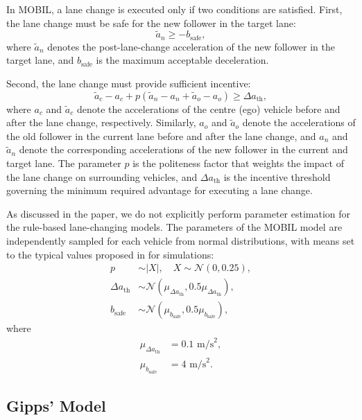 \documentclass[journal]{IEEEtran}
\begin{document}
In MOBIL, a lane change is executed only if two conditions are satisfied. First, the lane change must be safe for the new follower in the target lane:
\begin{equation}\label{eq:MOBIL1}
    \tilde{a}_n \ge -b_{\text{safe}},
\end{equation}
where $\tilde{a}_n$ denotes the post-lane-change acceleration of the new follower in the target lane, and $b_{\text{safe}}$ is the maximum acceptable deceleration.

Second, the lane change must provide sufficient incentive:
\begin{equation}\label{eq:MOBIL2}
    \tilde{a}_c - a_c + p\left( \tilde{a}_n - a_n + \tilde{a}_o - a_o \right) \ge \Delta a_{\text{th}},
\end{equation}
where $a_c$ and $\tilde{a}_c$ denote the accelerations of the centre (ego) vehicle before and after the lane change, respectively. Similarly, $a_o$ and $\tilde{a}_o$ denote the accelerations of the old follower in the current lane before and after the lane change, and $a_n$ and $\tilde{a}_n$ denote the corresponding accelerations of the new follower in the current and target lane. The parameter $p$ is the politeness factor that weights the impact of the lane change on surrounding vehicles, and $\Delta a_{\text{th}}$ is the incentive threshold governing the minimum required advantage for executing a lane change.

As discussed in the paper, we do not explicitly perform parameter estimation for the rule-based lane-changing models. The parameters of the MOBIL model are independently sampled for each vehicle from normal distributions, with means set to the typical values proposed in \cite{Arne1999} for simulations:
\begin{align*}
    p &\sim \lvert X \rvert, \quad X \sim \mathcal{N}(0, 0.25), \\ 
    \Delta a_{\text{th}}&\sim\mathcal{N}(\mu_{\Delta a_{\text{th}}},0.5\mu_{\Delta a_{\text{th}}}), \\ 
    b_{\text{safe}}&\sim\mathcal{N}(\mu_{b_{\text{safe}}},0.5\mu_{b_{\text{safe}}}),
\end{align*}
where
\begin{align*}
    \mu_{\Delta a_{\text{th}}}&=0.1 \text{ m/s}^2, \\ 
    \mu_{b_{\text{safe}}}&=4 \text{ m/s}^2.
\end{align*}

\subsection{Gipps' Model}\label{subsec:gipps}
\end{document}

